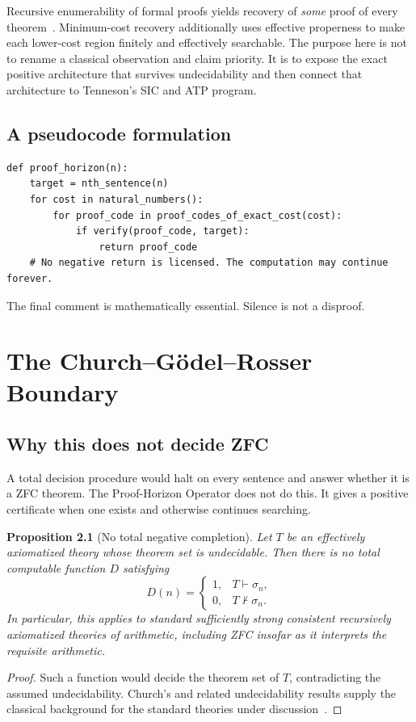 \documentclass[11pt,oneside]{book}
\newtheorem{proposition}[theorem]{Proposition}
\theoremstyle{definition}
\theoremstyle{remark}
\begin{document}
Recursive enumerability of formal proofs yields recovery of \emph{some} proof of every theorem~\cite{church1936,turing1936,rogers1987}. Minimum-cost recovery additionally uses effective properness to make each lower-cost region finitely and effectively searchable. The purpose here is not to rename a classical observation and claim priority. It is to expose the exact positive architecture that survives undecidability and then connect that architecture to Tenneson's SIC and ATP program.

\section{A pseudocode formulation}
\begin{lstlisting}[style=pythonstyle,caption={Pseudocode for the Universal Proof-Horizon Operator.}]
def proof_horizon(n):
    target = nth_sentence(n)
    for cost in natural_numbers():
        for proof_code in proof_codes_of_exact_cost(cost):
            if verify(proof_code, target):
                return proof_code
    # No negative return is licensed. The computation may continue forever.
\end{lstlisting}
The final comment is mathematically essential. Silence is not a disproof.

\chapter{The Church--G\"odel--Rosser Boundary}
\section{Why this does not decide ZFC}
A total decision procedure would halt on every sentence and answer whether it is a ZFC theorem. The Proof-Horizon Operator does not do this. It gives a positive certificate when one exists and otherwise continues searching.

\begin{proposition}[No total negative completion]\label{prop:no-total}
Let $T$ be an effectively axiomatized theory whose theorem set is undecidable. Then there is no total computable function $D$ satisfying
\[
D(n)=\begin{cases}
1,&T\vdash\sigma_n,\\
0,&T\nvdash\sigma_n.
\end{cases}
\]
In particular, this applies to standard sufficiently strong consistent recursively axiomatized theories of arithmetic, including ZFC insofar as it interprets the requisite arithmetic.
\end{proposition}
\begin{proof}
Such a function would decide the theorem set of $T$, contradicting the assumed undecidability. Church's and related undecidability results supply the classical background for the standard theories under discussion~\cite{church1936,turing1936,rosser1936}.
\end{proof}
\end{document}
